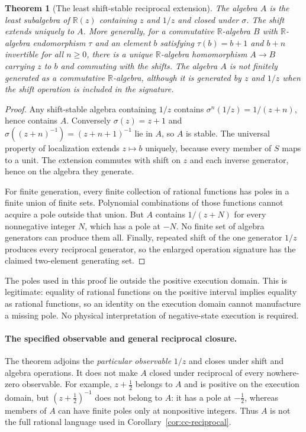 \documentclass[11pt]{article}
\newtheorem{theorem}{Theorem}[section]
\theoremstyle{definition}
\begin{document}
\begin{theorem}[The least shift-stable reciprocal extension]
\label{thm:cc-localization}
The algebra $A$ is the least subalgebra of $\mathbb R(z)$ containing $z$
and $1/z$ and closed under $\sigma$. The shift extends uniquely to $A$.
More generally, for a commutative $\mathbb R$-algebra $B$ with $\mathbb R$-algebra endomorphism
$\tau$ and an element $b$ satisfying $\tau(b)=b+1$ and $b+n$ invertible
for all $n\ge0$, there is a unique $\mathbb R$-algebra homomorphism
$A\to B$ carrying $z$ to $b$ and commuting with the shifts.
The algebra $A$ is not finitely generated as a commutative
$\mathbb R$-algebra, although it is generated by $z$ and $1/z$ when the
shift operation is included in the signature.
\end{theorem}
\begin{proof}
Any shift-stable algebra containing $1/z$ contains
$\sigma^n(1/z)=1/(z+n)$, hence contains $A$. Conversely $\sigma(z)=z+1$
and $\sigma((z+n)^{-1})=(z+n+1)^{-1}$ lie in $A$, so $A$ is stable.
The universal property of localization extends $z\mapsto b$ uniquely,
because every member of $S$ maps to a unit. The extension commutes with
shift on $z$ and each inverse generator, hence on the algebra they generate.

For finite generation, every finite collection of rational functions has
poles in a finite union of finite sets. Polynomial combinations of those
functions cannot acquire a pole outside that union. But $A$ contains
$1/(z+N)$ for every nonnegative integer $N$, which has a pole at $-N$.
No finite set of algebra generators can produce them all. Finally, repeated
shift of the one generator $1/z$ produces every reciprocal generator, so
the enlarged operation signature has the claimed two-element generating set.
\end{proof}

The poles used in this proof lie outside the positive execution domain.
This is legitimate: equality of rational functions on the positive interval
implies equality as rational functions, so an identity on the execution
domain cannot manufacture a missing pole. No physical interpretation of
negative-state execution is required.

\paragraph{The specified observable and general reciprocal closure.}
The theorem adjoins the \emph{particular observable} $1/z$ and closes under
shift and algebra operations. It does not make $A$ closed under reciprocal
of every nowhere-zero observable. For example, $z+\tfrac12$ belongs to $A$
and is positive on the execution domain, but $(z+\tfrac12)^{-1}$ does not
belong to $A$: it has a pole at $-\tfrac12$, whereas members of $A$ can have
finite poles only at nonpositive integers. Thus $A$ is not the full rational
language used in Corollary~\ref{cor:cc-reciprocal}.
\end{document}
